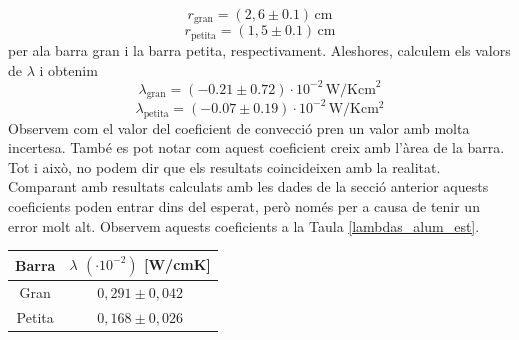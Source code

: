 \documentclass[12pt,twosides,onecolumn,openany]{article}
\newenvironment{Figura}
  {\par\medskip\noindent\minipage{\linewidth}}
  {\endminipage\par\medskip}
\begin{document}
\begin{multicols}{2}
\begin{equation*}
  r_{\text{gran}} = (2,6\pm0.1)\, \text{cm}
\end{equation*}
\begin{equation*}
  r_{\text{petita}} = (1,5\pm0.1)\, \text{cm}
\end{equation*}
per ala barra gran i la barra petita, respectivament. Aleshores, calculem els valors de $\lambda$ i obtenim
\begin{equation*}
  \lambda_{\text{gran}} = (-0.21\pm0.72)\cdot 10^{-2} \, \text{W}/\text{Kcm}^{2}
\end{equation*}
\begin{equation*}
  \lambda_{\text{petita}} = (-0.07\pm0.19)\cdot 10^{-2} \, \text{W}/\text{K}\text{cm}^{2}
\end{equation*}
Observem com el valor del coeficient de convecció pren un valor amb molta incertesa. També es pot notar com aquest coeficient creix amb l'àrea de la barra. Tot i això, no podem dir que els resultats coincideixen amb la realitat. Comparant amb resultats calculats amb les dades de la secció anterior aquests coeficients poden entrar dins del esperat, però només per a causa de tenir un error molt alt. Observem aquests coeficients a la Taula \ref{lambdas_alum_est}.
\begin{Figura}
  \centering
  \begin{tabular}{c|c}
    Barra & $\lambda$ $(\cdot 10^{-2})$ [W/cmK]\\ \hline \hline
    Gran & $0,291\pm0,042$\\
    Petita & $0,168\pm0,026$ 
  \end{tabular}
\end{Figura}

\end{multicols}
\end{document}
